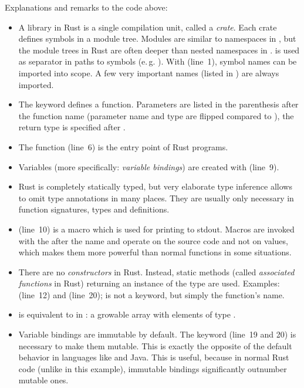 Explanations and remarks to the code above:

\begin{itemize}
  \item A library in Rust is a single compilation unit, called a \emph{crate}.
  Each crate defines symbols in a module tree.
  Modules are similar to namespaces in \cpp, but the module trees in Rust are often deeper than nested namespaces in \cpp.
  \code{::} is used as separator in paths to symbols (e.\,g. ).
  With  (line~1), symbol names can be imported into scope.
  A few very important names (listed in ) are always imported.
  \item The keyword  defines a function.
  Parameters are listed in the parenthesis after the function name (parameter name and type are flipped compared to \cpp), the return type is specified after \code{->}.
  \item The  function (line~6) is the entry point of Rust programs.
  \item Variables (more specifically: \emph{variable bindings}) are created with  (line~9).
  \item Rust is completely statically typed, but very elaborate type inference allows to omit type annotations in many places.
  They are usually only necessary in function signatures, types and  definitions.
  \item {} (line~10) is a macro which is used for printing to stdout.
  Macros are invoked with the \code{!} after the name and operate on the source code and not on values, which makes them more powerful than normal functions in some situations.
  \item There are no \emph{constructors} in Rust.
  Instead, static methods (called \emph{associated functions} in Rust) returning an instance of the type are used.
  Examples:  (line~12) and   (line~20);  is not a keyword, but simply the function's name.
  \item {} is equivalent to  in \cpp: a growable array with elements of type .
  \item Variable bindings are immutable by default.
  The keyword  (line~19 and 20) is necessary to make them mutable.
  This is exactly the opposite of the default behavior in languages like \cpp and Java.
  This is useful, because in normal Rust code (unlike in this example), immutable bindings significantly outnumber mutable ones.

\end{itemize}
